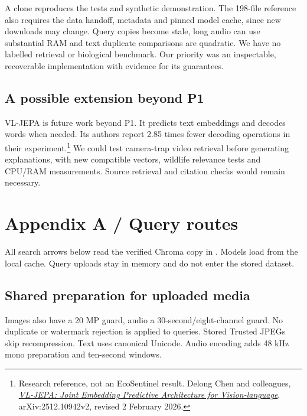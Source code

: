 \documentclass[10pt,a4paper]{article}
\begin{document}
A clone reproduces the tests and synthetic demonstration. The 198-file reference also requires the data handoff, metadata and pinned model cache, since new downloads may change. Query copies become stale, long audio can use substantial RAM and text duplicate comparisons are quadratic. We have no labelled retrieval or biological benchmark. Our priority was an inspectable, recoverable implementation with evidence for its guarantees.

\subsection*{A possible extension beyond P1}
VL-JEPA is future work beyond P1. It predicts text embeddings and decodes words when needed. Its authors report 2.85 times fewer decoding operations in their experiment.\footnote{Research reference, not an EcoSentinel result. Delong Chen and colleagues, \emph{\href{https://arxiv.org/abs/2512.10942v2}{VL-JEPA: Joint Embedding Predictive Architecture for Vision-language}}, arXiv:2512.10942v2, revised 2 February 2026.} We could test camera-trap video retrieval before generating explanations, with new compatible vectors, wildlife relevance tests and CPU/RAM measurements. Source retrieval and citation checks would remain necessary.


\clearpage
\renewcommand{\thepage}{A\arabic{page}}\setcounter{page}{1}
\section*{Appendix A / Query routes}
\fontsize{9.5}{11.7}\selectfont
All search arrows below read the verified Chroma copy in . Models load from the local cache. Query uploads stay in memory and do not enter the stored dataset.

\subsection*{Shared preparation for uploaded media}
\begin{center}
\end{center}
Images also have a 20 MP guard, audio a 30-second/eight-channel guard. No duplicate or watermark rejection is applied to queries. Stored Trusted JPEGs skip recompression. Text uses canonical Unicode. Audio encoding adds 48 kHz mono preparation and ten-second windows.
\end{document}
